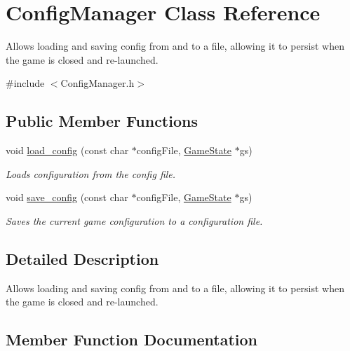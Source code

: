 \hypertarget{class_config_manager}{}\section{Config\+Manager Class Reference}
\label{class_config_manager}


Allows loading and saving config from and to a file, allowing it to persist when the game is closed and re-\/launched.  




{\ttfamily \#include $<$Config\+Manager.\+h$>$}

\subsection*{Public Member Functions}
\begin{DoxyCompactItemize}
\item 
void \mbox{\hyperlink{class_config_manager_ab63282f7838464020b7d26bd3bd10e47}{load\+\_\+config}} (const char $\ast$config\+File, \mbox{\hyperlink{struct_game_state}{Game\+State}} $\ast$gs)
\begin{DoxyCompactList}\small\item\em Loads configuration from the config file. \end{DoxyCompactList}\item 
void \mbox{\hyperlink{class_config_manager_ab7cbb6809061323ec279ddd6a46833df}{save\+\_\+config}} (const char $\ast$config\+File, \mbox{\hyperlink{struct_game_state}{Game\+State}} $\ast$gs)
\begin{DoxyCompactList}\small\item\em Saves the current game configuration to a configuration file. \end{DoxyCompactList}\end{DoxyCompactItemize}


\subsection{Detailed Description}
Allows loading and saving config from and to a file, allowing it to persist when the game is closed and re-\/launched. 



\subsection{Member Function Documentation}
\mbox{\label{class_config_manager_ab63282f7838464020b7d26bd3bd10e47}} 
